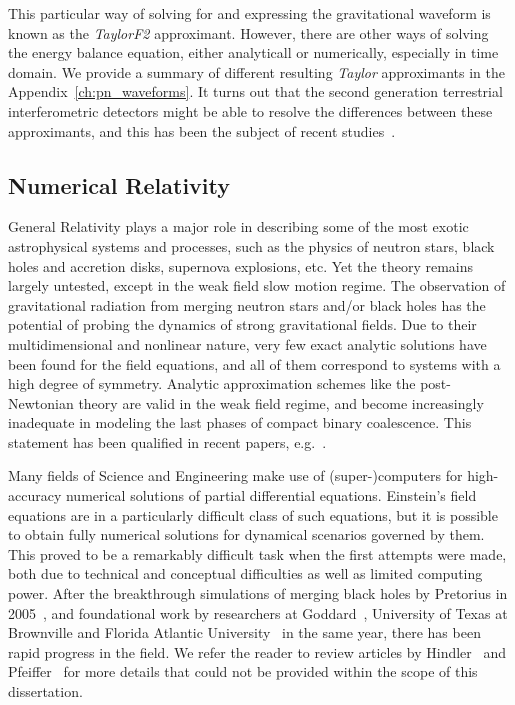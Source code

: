 This particular way of solving for and expressing the gravitational waveform 
is known as the {\it TaylorF2} approximant. However, there are other ways
of solving the energy balance equation, either analyticall or numerically,
especially in time domain. We provide a summary of different resulting 
{\it Taylor} approximants in the Appendix~\ref{ch:pn_waveforms}. It turns out 
that the second generation terrestrial interferometric detectors might be 
able to resolve the differences between these approximants, and this has been 
the subject of recent studies~\cite{Buonanno:2009zt,NRPNComparisonBoyleetal}.

\subsection{Numerical Relativity}
\label{sec:NRWaveforms}

General Relativity plays a major role in describing some of the most exotic 
astrophysical systems and processes, such as the physics of neutron stars, 
black holes and accretion disks, supernova explosions, etc. Yet the theory 
remains largely untested, except in the weak field slow motion regime. 
The observation of gravitational radiation from merging neutron stars and/or
black holes has the potential of probing the dynamics of strong gravitational
fields.
Due to their multidimensional and nonlinear nature, 
very few exact analytic solutions have been found for the field equations, 
and all of them correspond to systems with a high degree of symmetry.
Analytic approximation schemes like the post-Newtonian theory are valid in
the weak field regime, and become increasingly inadequate in 
modeling the last phases of compact binary coalescence. 
This statement has been qualified in recent papers, e.g.~\cite{Nitz:2013mxa}.

Many fields of Science and Engineering make use of (super-)computers for 
high-accuracy numerical solutions of partial differential equations. 
Einstein's field equations are in a particularly difficult class of such
equations, but it is possible to obtain fully numerical solutions for dynamical
scenarios governed by them. This proved to be a remarkably difficult task
when the first attempts were made, both due to technical and conceptual 
difficulties as well as limited computing power. After the breakthrough
simulations of merging black holes by Pretorius in 
2005~\cite{Pretorius2005}, and foundational work by researchers at 
Goddard~\cite{Campanelli:2005dd}, University of Texas at Brownville and Florida
Atlantic University~\cite{Campanelli:2005dd} in the same year, there has been
rapid progress in the field. 
We refer the reader to review articles by Hindler~\cite{Hinder:2010vn} and
Pfeiffer~\cite{Pfeiffer:2012pc} for more details that could not be provided
within the scope of this dissertation. 

